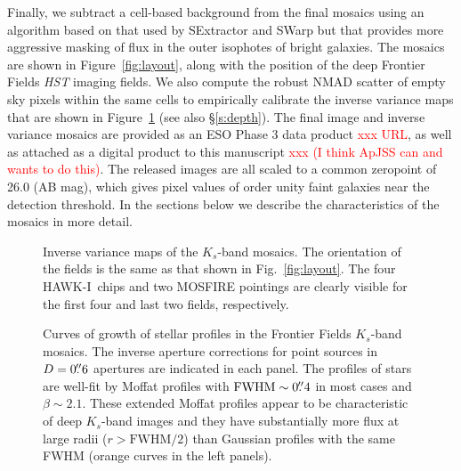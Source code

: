 \documentclass[preprint2]{aastex6}
\newcommand\XXX[1]{{\textcolor{red}{xxx #1}}}
\gdef\HAWKI{\mbox{HAWK-I}}
\begin{document}
Finally, we subtract a cell-based background from the final mosaics using an algorithm based on that used by SExtractor and SWarp but that provides more aggressive masking of flux in the outer isophotes of bright galaxies. The mosaics are shown in Figure~\ref{fig:layout}, along with the position of the deep Frontier Fields \textit{HST} imaging fields.  We also compute the robust NMAD scatter \citep{brammer:08} of empty sky pixels within the same cells to empirically calibrate the inverse variance maps that are shown in Figure~\ref{fig:ivar_mosaics} (see also \S\ref{s:depth}).  The final image and inverse variance mosaics are provided as an ESO Phase 3 data product \XXX{URL}, as well as attached as a digital product to this manuscript \XXX{(I think ApJSS can and wants to do this)}.  The released images are all scaled to a common zeropoint of 26.0 (AB mag), which gives pixel values of order unity faint galaxies near the detection threshold.  In the sections below we describe the characteristics of the mosaics in more detail.  

\begin{figure}[!t]
\caption{Inverse variance maps of the $K_s$-band mosaics.  The orientation of the fields is the same as that shown in Fig.~\ref{fig:layout}.  The four \HAWKI\ chips and two MOSFIRE pointings are clearly visible for the first four and last two fields, respectively.
\label{fig:ivar_mosaics}}  
\end{figure}

\begin{figure*}[!t]
\caption{Curves of growth of stellar profiles in the Frontier Fields $K_s$-band mosaics.  The inverse aperture corrections for point sources in $D=0\mbox{$.\!\!^{\prime\prime}$}6$ apertures are indicated in each panel.  The profiles of stars are well-fit by Moffat profiles with $\mathrm{FWHM}\sim0\mbox{$.\!\!^{\prime\prime}$}4$ in most cases and $\beta\sim2.1$.  These extended Moffat profiles appear to be characteristic of deep $K_s$-band images and they have substantially more flux at large radii ($r>\mathrm{FWHM}/2$) than Gaussian profiles with the same FWHM (orange curves in the left panels). \label{fig:cog}}  
\end{figure*}
\end{document}
